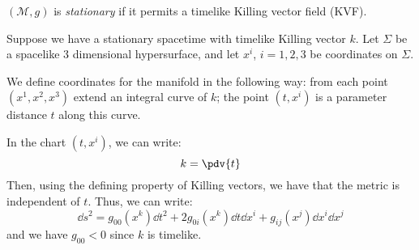 \documentclass{jknotes}
\begin{document}
\begin{defn}
    \((\mathcal{M},g)\) is \emph{stationary} if it permits a timelike Killing vector field (KVF).
\end{defn}

\begin{wrapfigure}{L}{0.3\textwidth}
    \centering
\end{wrapfigure}

Suppose we have a stationary spacetime with timelike Killing vector \(k\). Let \(\Sigma\) be a spacelike 3 dimensional hypersurface, and let \(x^i\), \(i=1,2,3\) be coordinates on \(\Sigma\).

We define coordinates for the manifold in the following way: from each point \((x^1,x^2,x^3)\) extend an integral curve of \(k\); the point \((t,x^i)\) is a parameter distance \(t\) along this curve.

In the chart \((t,x^i)\), we can write:
\begin{equation}
    k=\pdv{t}
\end{equation}
Then, using the defining property of Killing vectors, we have that the metric is independent of \(t\). Thus, we can write:
\begin{equation}
    \dd{s}^2 = g_{00}(x^k)\dd{t}^2 + 2g_{0i}(x^k)\dd{t}\dd{x^i} + g_{ij}(x^j)\dd{x^i}\dd{x^j}
\end{equation}
and we have \(g_{00}<0\) since \(k\) is timelike.
\end{document}

